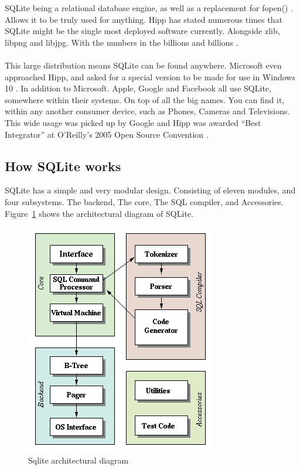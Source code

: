 SQLite being a relational database engine, as well as a replacement for fopen() \citep{sqlite}. Allows it to be truly used for anything. Hipp has stated numerous times that SQLite might be the single most deployed software currently. Alongside zlib, libpng and libjpg. With the numbers in the billions and billions \citep{sqlite}.
\\\\
This large distribution means SQLite can be found anywhere. Microsoft even approached Hipp, and asked for a special version to be made for use in Windows 10 \citep{sqlitetalk}. In addition to Microsoft. Apple, Google and Facebook all use SQLite, somewhere within their systems. On top of all the big names. You can find it, within any another consumer device, such as Phones, Cameras and Televisions. This wide usage was picked up by Google and Hipp was awarded “Best Integrator” at O’Reilly’s 2005 Open Source Convention \citep{sqlitedefguide}. 

\subsection{How SQLite works}
\label{subsec:how_sqlite_works}

SQLite has a simple and very modular design. Consisting of eleven modules, and four subsystems. The backend, The core, The SQL compiler, and Accessories. Figure~\ref{fig:sqlite_arch} shows the architectural diagram of SQLite.

\begin{figure}[H]
	\centering
	\includegraphics[scale=0.50]{images/sqlite_arch.png}
	\caption{Sqlite architectural diagram \citep{sqlite}}
	\label{fig:sqlite_arch}
\end{figure}

